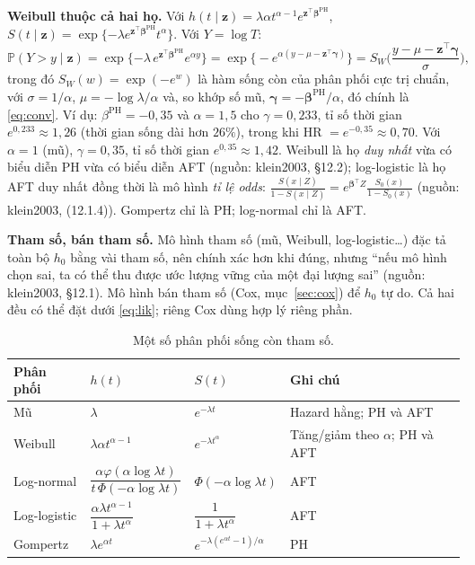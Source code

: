 \documentclass[11pt,a4paper,notitlepage]{report}
\newcommand{\Prob}{\mathbb{P}}
\newcommand{\tr}{^{\top}}
\providecommand{\nguon}[1]{(nguồn: #1)}
\begin{document}
\begin{bosung}
\textbf{Weibull thuộc cả hai họ.} Với $h(t\mid\bm z)=\lambda\alpha t^{\alpha-1}e^{\bm z\tr\bm\beta^{\mathrm{PH}}}$, $S(t\mid\bm z)=\exp\{-\lambda e^{\bm z\tr\bm\beta^{\mathrm{PH}}}t^{\alpha}\}$. Với $Y=\log T$:
\[
\Prob(Y>y\mid\bm z)=\exp\{-\lambda\,e^{\bm z\tr\bm\beta^{\mathrm{PH}}}e^{\alpha y}\}=\exp\Big\{-e^{\alpha(y-\mu-\bm z\tr\bm\gamma)}\Big\}=S_W\!\Big(\frac{y-\mu-\bm z\tr\bm\gamma}{\sigma}\Big),
\]
trong đó $S_W(w)=\exp(-e^{w})$ là hàm sống còn của phân phối cực trị chuẩn, với $\sigma=1/\alpha$, $\mu=-\log\lambda/\alpha$ và, so khớp số mũ, $\bm\gamma=-\bm\beta^{\mathrm{PH}}/\alpha$, đó chính là \eqref{eq:conv}.
Ví dụ: $\beta^{\mathrm{PH}}=-0{,}35$ và $\alpha=1{,}5$ cho $\gamma=0{,}233$, tỉ số thời gian $e^{0{,}233}\approx1{,}26$ (thời gian sống dài hơn $26\%$), trong khi HR $=e^{-0{,}35}\approx0{,}70$.
Với $\alpha=1$ (mũ), $\gamma=0{,}35$, tỉ số thời gian $e^{0{,}35}\approx1{,}42$.
Weibull là họ \emph{duy nhất} vừa có biểu diễn PH vừa có biểu diễn AFT \nguon{klein2003, \S12.2}; log-logistic là họ AFT duy nhất đồng thời là mô hình \emph{tỉ lệ odds}:
$\frac{S(x\mid Z)}{1-S(x\mid Z)}=e^{\bm\beta\tr Z}\frac{S_0(x)}{1-S_0(x)}$ \nguon{klein2003, (12.1.4)}. Gompertz chỉ là PH; log-normal chỉ là AFT.

\textbf{Tham số, bán tham số.} Mô hình tham số (mũ, Weibull, log-logistic\ldots) đặc tả toàn bộ $h_0$ bằng vài tham số, nên chính xác hơn khi đúng, nhưng
``nếu mô hình chọn sai, ta có thể thu được ước lượng vững của một đại lượng sai'' \nguon{klein2003, \S12.1}. Mô hình bán tham số (Cox, mục~\ref{sec:cox}) để $h_0$ tự do.
Cả hai đều có thể đặt dưới \eqref{eq:lik}; riêng Cox dùng hợp lý riêng phần.
\end{bosung}

\begin{table}[ht]\centering
\caption{Một số phân phối sống còn tham số.}\label{tab:phanphoi}
\begin{tabular}{llll}
\toprule
Phân phối & $h(t)$ & $S(t)$ & Ghi chú\\
\midrule
Mũ & $\lambda$ & $e^{-\lambda t}$ & Hazard hằng; PH và AFT\\
Weibull & $\lambda\alpha t^{\alpha-1}$ & $e^{-\lambda t^{\alpha}}$ & Tăng/giảm theo $\alpha$; PH và AFT\\
Log-normal & $\dfrac{\alpha\varphi(\alpha\log\lambda t)}{t\,\Phi(-\alpha\log\lambda t)}$ & $\Phi(-\alpha\log\lambda t)$ & AFT\\[8pt]
Log-logistic & $\dfrac{\alpha\lambda t^{\alpha-1}}{1+\lambda t^{\alpha}}$ & $\dfrac{1}{1+\lambda t^{\alpha}}$ & AFT\\[8pt]
Gompertz & $\lambda e^{\alpha t}$ & $e^{-\lambda(e^{\alpha t}-1)/\alpha}$ & PH\\
\bottomrule
\end{tabular}
\end{table}
\end{document}
